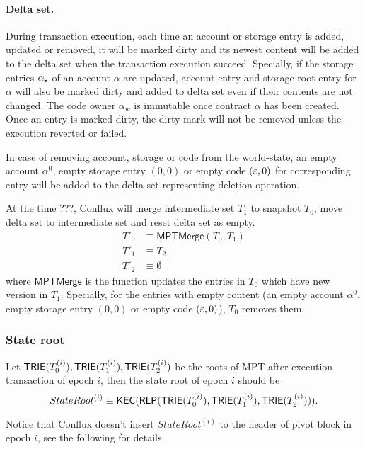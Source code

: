 \paragraph{Delta set.}

During transaction execution, each time an account or storage entry is added, updated or removed, it will be marked dirty and its newest content will be added to the delta set when the transaction execution succeed. 
%
Specially, if the storage entries $\alpha_{\bf s}$ of an account $\alpha$ are updated, account entry and storage root entry for $\alpha$ will also be marked dirty and added to delta set even if their contents are not changed. The code owner $\alpha_w$ is immutable once contract $\alpha$ has been created. 
%
Once an entry is marked dirty, the dirty mark will not be removed unless the execution reverted or failed. 

In case of removing account, storage or code from the world-state, an empty account $\alpha^0$, empty storage entry $(0,0)$ or empty code $(\mathbb{\varepsilon},0)$ for corresponding entry will be added to the delta set representing deletion operation.

At the time ???, Conflux will merge intermediate set $T_1$ to snapshot $T_0$, move delta set to intermediate set and reset delta set as empty. 
\begin{align}
	T'_0 &\equiv \mathsf{MPTMerge}(T_0,T_1) \\
	T'_1 &\equiv T_2 \\
	T'_2 &\equiv \emptyset
\end{align}
%
where $\mathsf{MPTMerge}$ is the function updates the entries in $T_0$ which have new version in $T_1$. Specially, for the entries with empty content (an empty account $\alpha^0$, empty storage entry $(0,0)$ or empty code $(\mathbb{\varepsilon},0)$), $T_0$ removes them.  




\subsubsection{State root}

Let $\mathsf{TRIE}(T^{(i)}_0),\mathsf{TRIE}(T^{(i)}_1),\mathsf{TRIE}(T^{(i)}_2)$ be the roots of MPT after execution transaction of epoch $i$, then the state root of epoch $i$ should be 
%
$$ StateRoot^{(i)}\equiv\mathsf{KEC}(\mathsf{RLP}(\mathsf{TRIE}(T^{(i)}_0),\mathsf{TRIE}(T^{(i)}_1),\mathsf{TRIE}(T^{(i)}_2))).$$

Notice that Conflux doesn't insert $StateRoot^{(i)}$ to the header of pivot block in epoch $i$, see the following for details. 



